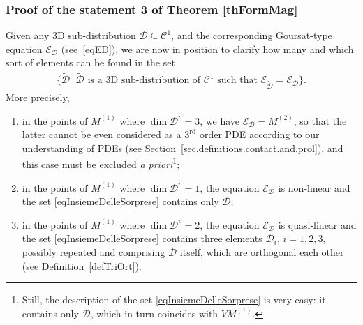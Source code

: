 \documentclass[10pt,a4paper]{amsart}
\newcommand{\C}{\mathcal{C}}
\newcommand{\D}{\mathcal{D}}
\newcommand{\E}{\mathcal{E}}
\newcommand{\Rd}{^\textrm{rd}}
\numberwithin{equation}{section}
\begin{document}
\subsubsection{Proof of the statement 3 of Theorem \ref{thFormMag}}\label{sec.3.3}

Given any 3D sub-distribution $\D\subseteq \C^1$,
and the corresponding Goursat-type equation $\E_\D$ (see~\eqref{eqED}), we are now in position to clarify how many and which sort of elements can be found in the set
\begin{gather}\label{eqInsiemeDelleSorprese}
\big\{\widetilde{\D}\,|\, \widetilde{\D} \textrm{ is a 3D sub-distribution of }\C^1\textrm{ such that }\E_{\widetilde{\D}}=\E_\D\big\}.
\end{gather}
More precisely,
\begin{enumerate}\itemsep=0pt
\item[1)] in the points of $M^{(1)}$ where $\dim\D^v=3$, we have $\E_\D=M^{(2)}$, so that the latter cannot be even considered as a $3\Rd$ order PDE according to our understanding of PDEs (see Section~\ref{sec.definitions.contact.and.prol}), and this case must be excluded \emph{a priori}\footnote{Still, the description of the set \eqref{eqInsiemeDelleSorprese} is very easy: it contains only $\D$, which in turn coincides with $VM^{(1)}$.};
\item[2)] in the points of $M^{(1)}$ where $\dim\D^v=1$, the equation $\E_\D$ is non-linear and the set \eqref{eqInsiemeDelleSorprese} contains only $\D$;
\item[3)] in the points of $M^{(1)}$ where $\dim\D^v=2$, the equation $\E_\D$ is quasi-linear and the set \eqref{eqInsiemeDelleSorprese} contains three elements $\D_i$, $i=1,2,3$, possibly repeated and comprising $\D$ itself, which
are {orthogonal} each other (see Def\/inition~\ref{defTriOrt}).
\end{enumerate}
\end{document}
